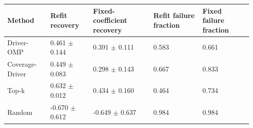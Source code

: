 \begin{tabular}{lllll}
\toprule
Method & Refit recovery & Fixed-coefficient recovery & Refit failure fraction & Fixed failure fraction \\
\midrule
Driver-OMP & 0.461 $\pm$ 0.144 & 0.391 $\pm$ 0.111 & 0.583 & 0.661 \\
Coverage-Driver & 0.449 $\pm$ 0.083 & 0.298 $\pm$ 0.143 & 0.667 & 0.833 \\
Top-k & 0.632 $\pm$ 0.012 & 0.434 $\pm$ 0.160 & 0.464 & 0.734 \\
Random & -0.670 $\pm$ 0.612 & -0.649 $\pm$ 0.637 & 0.984 & 0.984 \\
\bottomrule
\end{tabular}
